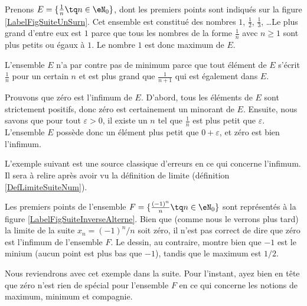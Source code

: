 \begin{example}
	Prenons $E=\{ \frac{1}{ n }\tq n\in\eN_0 \}$, dont les premiers points sont indiqués sur la figure \ref{LabelFigSuiteUnSurn}. Cet ensemble est constitué des nombres $1$, $\frac{ 1 }{2}$, $\frac{1}{ 3 }$, \ldots Le plus grand d'entre eux est $1$ parce que tous les nombres de la forme $\frac{1}{ n }$ avec $n\geq 1$ sont plus petits ou égaux à $1$. Le nombre $1$ est donc maximum de $E$.

	L'ensemble $E$ n'a par contre pas de minimum parce que tout élément de $E$ s'écrit $\frac{1}{ n }$ pour un certain $n$ et est plus grand que $\frac{1}{ n+1 }$ qui est également dans $E$.

	Prouvons que zéro est l'infimum de $E$. D'abord, tous les éléments de $E$ sont strictement positifs, donc zéro est certainement un minorant de $E$. Ensuite, nous savons que pour tout $\varepsilon>0$, il existe un $n$ tel que $\frac{1}{ n }$ est plus petit que $\varepsilon$. L'ensemble $E$ possède donc un élément plus petit que $0+\varepsilon$, et zéro est bien l'infimum.
\end{example}

\newcommand{\CaptionFigSuiteUnSurn}{Les premiers points du type $x_n=1/n$.}


L'exemple suivant est une source classique d'erreurs en ce qui concerne l'infimum. Il sera à relire après avoir vu la définition de limite (définition \ref{DefLimiteSuiteNum}).

\begin{example}
	Les premiers points de l'ensemble $F=\{ \frac{ (-1)^n }{ n }\tq n\in\eN_0 \}$ sont représentés à la figure \ref{LabelFigSuiteInverseAlterne}. Bien que (comme nous le verrons plus tard) la limite de la suite $x_n=(-1)^n/n$ soit zéro, il n'est pas correct de dire que zéro est l'infimum de l'ensemble $F$. Le dessin, au contraire, montre bien que $-1$ est le minium (aucun point est plus bas que $-1$), tandis que le maximum est $1/2$.

	Nous reviendrons avec cet exemple dans la suite. Pour l'instant, ayez bien en tête que zéro n'est rien de spécial pour l'ensemble $F$ en ce qui concerne les notions de maximum, minimum et compagnie.
\end{example}
\newcommand{\CaptionFigSuiteInverseAlterne}{Les quelque premiers points du type $(-1)^n/n$.}


